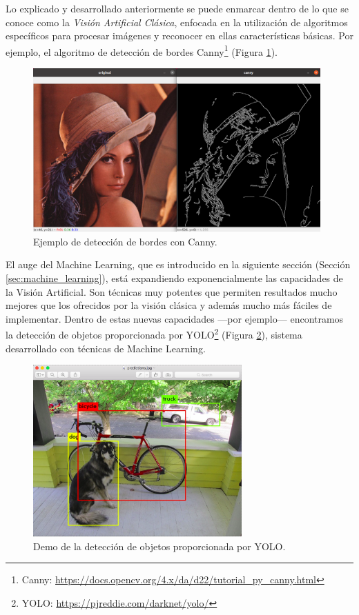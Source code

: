 Lo explicado y desarrollado anteriormente se puede enmarcar dentro de lo que se conoce como la \textit{Visión Artificial Clásica}, enfocada en la utilización de algoritmos específicos para procesar imágenes y reconocer en ellas características básicas. Por ejemplo, el algoritmo de detección de bordes Canny\footnote{Canny: \url{https://docs.opencv.org/4.x/da/d22/tutorial_py_canny.html}} (Figura \ref{fig:canny}).\\

\begin{figure} [h!]
  \begin{center}
    \includegraphics[width=11cm]{figs/canny.png}
  \end{center}
  \caption{Ejemplo de detección de bordes con Canny.}
  \label{fig:canny}
\end{figure}

El auge del Machine Learning, que es introducido en la siguiente sección (Sección \ref{sec:machine_learning}), está expandiendo exponencialmente las capacidades de la Visión Artificial. Son técnicas muy potentes que permiten resultados mucho mejores que los ofrecidos por la visión clásica y además mucho más fáciles de implementar. Dentro de estas nuevas capacidades ---por ejemplo--- encontramos la detección de objetos proporcionada por YOLO\footnote{YOLO: \url{https://pjreddie.com/darknet/yolo/}} (Figura \ref{fig:yolo}), sistema desarrollado con técnicas de Machine Learning.

\begin{figure} [h!]
  \begin{center}
    \includegraphics[width=8cm]{figs/yolo.png}
  \end{center}
  \caption{Demo de la detección de objetos proporcionada por YOLO.}
  \label{fig:yolo}
\end{figure}

